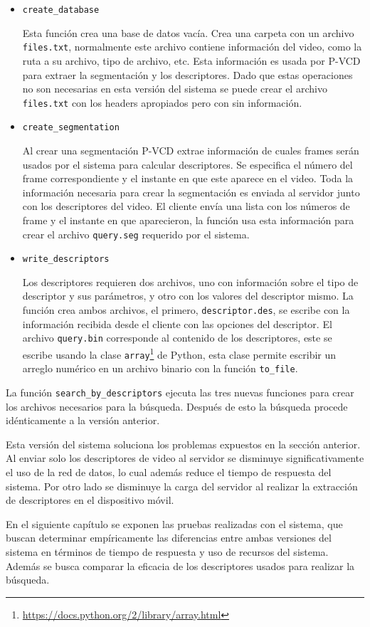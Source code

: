 \begin{itemize}

\item{\texttt{create\_database}} 

Esta función crea una base de datos vacía. Crea una carpeta con un archivo \texttt{files.txt}, normalmente este archivo contiene información del video, como la ruta a su archivo, tipo de archivo, etc. Esta información es usada por P-VCD para extraer la segmentación y los descriptores. Dado que estas operaciones no son necesarias en esta versión del sistema se puede crear el archivo \texttt{files.txt} con los headers apropiados pero con sin información. 

\item{\texttt{create\_segmentation}} 

Al crear una segmentación P-VCD extrae información de cuales frames serán usados por el sistema para calcular descriptores. Se especifica el número del frame correspondiente y el instante en que este aparece en el video. Toda la información necesaria para crear la 
segmentación es enviada al servidor junto con los descriptores del video. El cliente envía una lista con los números de frame y el instante en que aparecieron, la función usa esta información para crear el archivo \texttt{query.seg} requerido por el sistema. 

\item{\texttt{write\_descriptors}} 

Los descriptores requieren dos archivos, uno con información sobre el tipo de descriptor y sus parámetros, y otro con los valores del descriptor mismo. La función crea ambos archivos, el primero, \texttt{descriptor.des}, se escribe con la información recibida desde el cliente con las opciones del descriptor. El archivo \texttt{query.bin} corresponde al contenido de los descriptores, este se escribe usando la clase \texttt{array}\footnote{\url{https://docs.python.org/2/library/array.html}} de Python, esta clase permite escribir un arreglo numérico en un archivo binario con la función \texttt{to\_file}.  
\end{itemize}

La función \texttt{search\_by\_descriptors} ejecuta las tres nuevas funciones para crear los archivos necesarios para la búsqueda. Después de esto la búsqueda procede idénticamente a la versión anterior.

Esta versión del sistema soluciona los problemas expuestos en la sección anterior. Al enviar solo los descriptores de video al servidor se disminuye significativamente el uso de la red de datos, lo cual además reduce el tiempo de respuesta del sistema. Por otro lado se disminuye la carga del servidor al realizar la extracción de descriptores en el dispositivo móvil.

En el siguiente capítulo se exponen las pruebas realizadas con el sistema, que buscan determinar empíricamente las diferencias entre ambas versiones del sistema en términos de tiempo de respuesta y uso de recursos del sistema. Además se busca comparar la eficacia de los descriptores usados para realizar la búsqueda. 